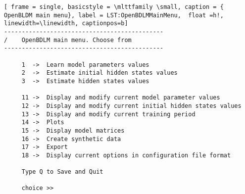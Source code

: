 \begin{lstlisting}[ frame = single, basicstyle = \mlttfamily \small, caption = { OpenBLDM main menu}, label = LST:OpenBDLMMainMenu,  float =h!, linewidth=\linewidth, captionpos=b]
---------------------------------------------
/    OpenBDLM main menu. Choose from 
--------------------------------------------- 

     1  ->  Learn model parameters values 
     2  ->  Estimate initial hidden states values 
     3  ->  Estimate hidden states values 

     11 ->  Display and modify current model parameter values 
     12 ->  Display and modify current initial hidden states values 
     13 ->  Display and modify current training period 
     14 ->  Plots 
     15 ->  Display model matrices 
     16 ->  Create synthetic data 
     17 ->  Export
     18 ->  Display current options in configuration file format 

     Type Q to Save and Quit 

     choice >> 
\end{lstlisting}




